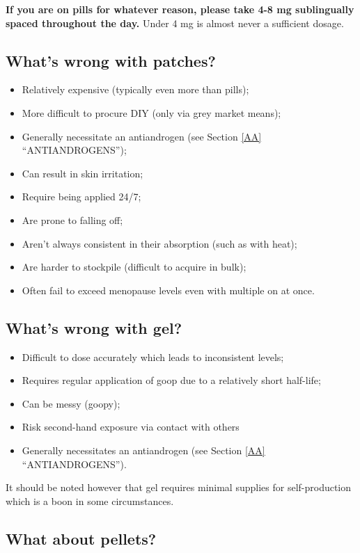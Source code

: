 \documentclass{article}
\begin{document}
\textbf{If you are on pills for whatever reason, please take 4-8 mg sublingually spaced throughout the day.} Under 4 mg is almost never a sufficient dosage.

\subsection{What’s wrong with patches?}

\begin{itemize}
  \item Relatively expensive (typically even more than pills);
  \item More difficult to procure DIY (only via grey market means);
  \item Generally necessitate an antiandrogen (see Section \ref{AA} “ANTIANDROGENS”);
  \item Can result in skin irritation;
  \item Require being applied 24/7;
  \item Are prone to falling off;
  \item Aren’t always consistent in their absorption (such as with heat);
  \item Are harder to stockpile (difficult to acquire in bulk);
  \item Often fail to exceed menopause levels even with multiple on at once.
\end{itemize}

\subsection{What’s wrong with gel?}

\begin{itemize}
  \item Difficult to dose accurately which leads to inconsistent levels;
  \item Requires regular application of goop due to a relatively short half-life;
  \item Can be messy (goopy);
  \item Risk second-hand exposure via contact with others
  \item Generally necessitates an antiandrogen (see Section \ref{AA} “ANTIANDROGENS”).
\end{itemize}

It should be noted however that gel requires minimal supplies for self-production which is a boon in some circumstances.

\subsection{What about pellets?}
\end{document}
